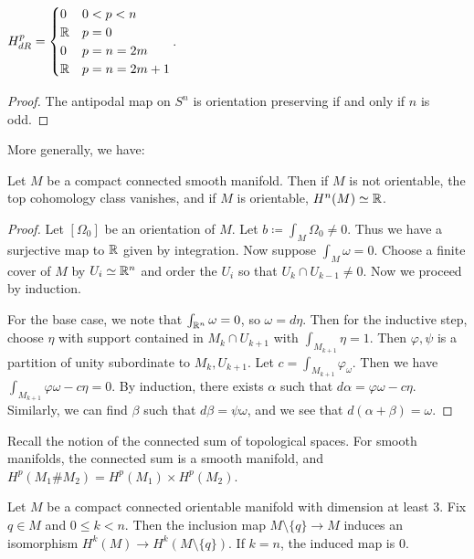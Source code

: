 \documentclass[twoside, 10pt]{article}
\begin{document}
    \begin{cor} $H^p_{dR} = \begin{cases} 0 & 0 < p < n \\ \mathbb{R} & p = 0 \\ 0 &
    p=n=2m \\ \mathbb{R} & p=n=2m+1 \end{cases}$.  \end{cor}

    \begin{proof} The antipodal map on $S^n$ is orientation preserving if and
    only if $n$ is odd.  \end{proof}

    More generally, we have: \begin{thm} Let $M$ be a compact connected smooth
    manifold. Then if $M$ is not orientable, the top cohomology class vanishes,
and if $M$ is orientable, $H^n(M) \simeq \mathbb{R}$.  \end{thm}

    \begin{proof} Let $[\Omega_0]$ be an orientation of $M$. Let $b \coloneqq
        \int_M \Omega_0 \neq 0$. Thus we have a surjective map to $\mathbb{R}$ given by
        integration. Now suppose $\int_M \omega = 0$. Choose a finite cover of
        $M$ by $U_i \simeq \mathbb{R}^n$ and order the $U_i$ so that $U_k \cap U_{k-1}
        \neq 0$. Now we proceed by induction.

        For the base case, we note that $\int_{\mathbb{R}^n} \omega = 0$, so $\omega =
    d\eta$. Then for the inductive step, choose $\eta$ with support contained
in $M_k \cap U_{k+1}$ with $\int_{M_{k+1}} \eta = 1$. Then $\varphi, \psi$ is a
partition of unity subordinate to $M_k, U_{k+1}$. Let $c = \int_{M_{k+1}}
\varphi_{\omega}$. Then we have $\int_{M_{k+1}} \varphi \omega - c \eta = 0$.
By induction, there exists $\alpha$ such that $d\alpha = \varphi\omega -
c\eta$. Similarly, we can find $\beta$ such that $d\beta = \psi \omega$, and we
see that $d(\alpha+\beta) = \omega$.  \end{proof}

    Recall the notion of the connected sum of topological spaces. For smooth
    manifolds, the connected sum is a smooth manifold, and $H^p(M_1 \# M_2) =
    H^p(M_1) \times H^p(M_2)$.

    \begin{prop} Let $M$ be a compact connected orientable manifold with
        dimension at least $3$. Fix $q \in M$ and $0 \leq k < n$. Then the
        inclusion map $M \setminus \{q\} \to M$ induces an isomorphism $H^k(M)
        \to H^k(M \setminus \{q\})$. If $k=n$, the induced map is $0$.
    \end{prop}
\end{document}
